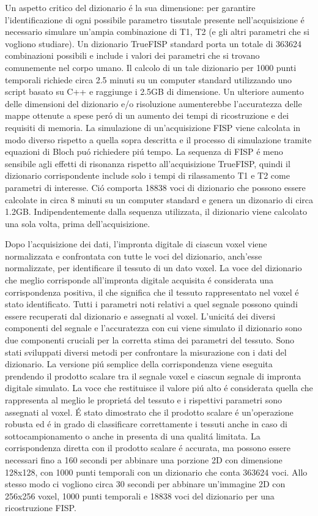 \documentclass[a4paper,12pt]{report}
\begin{document}
 Un aspetto critico del dizionario \'e la sua dimensione: per garantire l'identificazione di ogni possibile parametro tissutale presente nell'acquisizione \'e necessario simulare un'ampia combinazione di T1, T2 (e gli altri parametri che si vogliono studiare). 
 Un dizionario TrueFISP standard porta un totale di 363624 combinazioni possibili e include i valori dei parametri che si trovano comunemente nel corpo umano. 
 Il calcolo di un tale dizionario per 1000 punti temporali richiede circa 2.5 minuti su un computer standard utilizzando uno script basato su C++ e raggiunge i 2.5GB di dimensione. 
 Un ulteriore aumento delle dimensioni del dizionario e/o risoluzione aumenterebbe l'accuratezza delle mappe ottenute a spese per\'o di un aumento dei tempi di ricostruzione e dei requisiti di memoria. 
 La simulazione di un'acquisizione FISP viene calcolata in modo diverso rispetto a quella sopra descritta e il processo di simulazione tramite equazioni di Bloch pu\'o richiedere pi\'u tempo. 
 La sequenza di FISP \'e meno sensibile agli effetti di risonanza rispetto all'acquisizione TrueFISP, quindi il dizionario corrispondente include solo i tempi di rilassamento T1 e T2 come parametri di interesse. 
 Ci\'o comporta 18838 voci di dizionario che possono essere calcolate in circa 8 minuti su un computer standard e genera un dizonario di circa 1.2GB. 
 Indipendentemente dalla sequenza utilizzata, il dizionario viene calcolato una sola volta, prima dell'acquisizione. 
 
 Dopo l'acquisizione dei dati, l'impronta digitale di ciascun voxel viene normalizzata e confrontata con tutte le voci del dizionario, anch'esse normalizzate, per identificare il tessuto di un dato voxel. 
 La voce del dizionario che meglio corrisponde all'impronta digitale acquisita \'e considerata una corrispondenza positiva, il che significa che il tessuto rappresentato nel voxel \'e stato identificato. 
 Tutti i parametri noti relativi a quel segnale possono quindi essere recuperati dal dizionario e assegnati al voxel. 
 L'unicit\'a dei diversi componenti del segnale e l'accuratezza con cui viene simulato il dizionario sono due componenti cruciali per la corretta stima dei parametri del tessuto. 
 Sono stati sviluppati diversi metodi per confrontare la misurazione con i dati del dizionario. 
 La versione pi\'u semplice della corrispondenza viene eseguita prendendo il prodotto scalare tra il segnale voxel e ciascun segnale di impronta digitale simulato. 
 La voce che restituisce il valore pi\'u alto \'e considerata quella che rappresenta al meglio le propriet\'a del tessuto e i rispettivi parametri sono assegnati al voxel. 
 \'E stato dimostrato che il prodotto scalare \'e un'operazione robusta ed \'e in grado di classificare correttamente i tessuti anche in caso di sottocampionamento o anche in presenta di una qualit\'a limitata. 
 La corrispondenza diretta con il prodotto scalare \'e accurata, ma possono essere necessari fino a 160 secondi per abbinare una porzione 2D con dimensione 128x128, con 1000 punti temporali con un  dizionario che conta 363624 voci. 
 Allo stesso modo ci vogliono circa 30 secondi per abbinare un'immagine 2D con 256x256 voxel, 1000 punti temporali e 18838 voci del dizionario per una ricostruzione FISP. 
 
\end{document}
